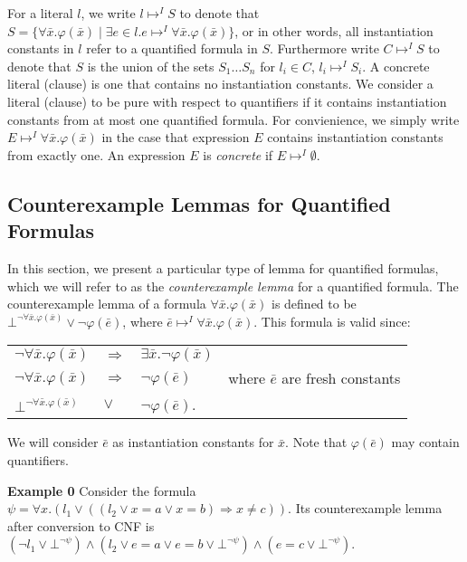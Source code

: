 \documentclass{llncs}
\begin{document}
For a literal $l$, we write $l \mapsto^I S$ to denote that $S = \{ \forall \bar{x}. \varphi( \bar{x} ) \mid \exists e \in l. e \mapsto^I \forall \bar{x}. \varphi( \bar{x} ) \}$, or in other words, all instantiation constants in $l$ refer to a quantified formula in $S$.
Furthermore write $C \mapsto^I S$ to denote that $S$ is the union of the sets $S_1 \ldots S_n$ for $l_i \in C$, $l_i \mapsto^I S_i$.
A concrete literal (clause) is one that contains no instantiation constants.
We consider a literal (clause) to be pure with respect to quantifiers if it contains instantiation constants from at most one quantified formula.
For convienience, we simply write $E \mapsto^I \forall \bar{x}. \varphi( \bar{x} )$ in the case that expression $E$ contains instantiation constants from exactly one.
An expression $E$ is \emph{concrete} if $E \mapsto^I \emptyset$.

\subsection{Counterexample Lemmas for Quantified Formulas}
\label{sec:CENF}

In this section, we present a particular type of lemma for quantified formulas, which we will refer to as the \emph{counterexample lemma} for a quantified formula.
The counterexample lemma of a formula $\forall \bar{x}. \varphi( \bar{ x } )$ is defined to be $\bot^{\neg \forall \bar{x}. \varphi( \bar{x} )} \vee \neg \varphi( \bar{e} )$, where $\bar{e} \mapsto^I \forall \bar{x}. \varphi( \bar{x} )$.
This formula is valid since:

\begin{tabular}{llll}
$\neg \forall \bar{x}. \varphi( \bar{ x } )$ & $\Rightarrow$ & $\exists \bar{x}. \neg \varphi( \bar{x} )$ \\
$\neg \forall \bar{x}. \varphi( \bar{ x } )$ & $\Rightarrow$ & $\neg \varphi( \bar{e} )$  & where $\bar{e}$ are fresh constants \\
$\bot^{\neg \forall \bar{x}. \varphi( \bar{x} )}$ & $\vee$ & $\neg \varphi( \bar{e} )$. \\
\end{tabular}

We will consider $\bar{e}$ as instantiation constants for $\bar{x}$.
Note that $\varphi(\bar{e})$ may contain quantifiers.

{\bf Example 0}
Consider the formula $\psi = \forall x. (l_1 \vee (( l_2 \vee x = a \vee x = b ) \Rightarrow x \neq c))$.
Its counterexample lemma after conversion to CNF is $( \neg l_1 \vee \bot^{\neg \psi}) \wedge ( l_2 \vee e = a \vee e = b \vee \bot^{\neg \psi} ) \wedge ( e = c \vee \bot^{\neg \psi})$. \\
\end{document}
